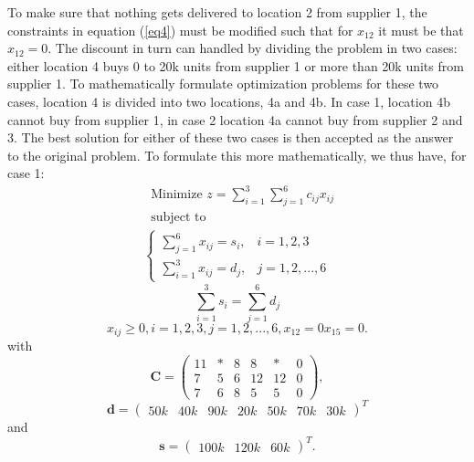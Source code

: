 \documentclass{article}
\begin{document}
  \noindent
  To make sure that nothing gets delivered to location 2 from supplier 1, the
  constraints in equation (\ref{eq4}) must be modified such that for $x_{12}$
  it must be that $x_{12} = 0$. The discount in turn can handled by dividing
  the problem in two cases: either location 4 buys 0 to 20k units from supplier
  1 or more than 20k units from supplier 1. To mathematically formulate
  optimization problems for these two cases, location 4 is divided into two
  locations, 4a and 4b. In case 1, location 4b cannot buy from supplier 1, in
  case 2 location 4a cannot buy from supplier 2 and 3. The best solution for
  either of these two cases is then accepted as the answer to the original
  problem. To formulate this more mathematically, we thus have, for case 1:
  \begin{align*}
  & \text{Minimize } z = \sum_{i=1}^{3}\sum_{j=1}^6 c_{ij}x_{ij} \\
  & \text{subject to}
    \label{eq10}
  \end{align*}
  \begin{align}
    \begin{cases}
      \sum_{j=1}^{6} x_{ij} = s_{i}, & i = 1, 2, 3 \\
      \sum_{i=1}^{3} x_{ij} = d_{j}, & j = 1, 2, ..., 6
    \end{cases}
  \end{align}
  \begin{equation}
    \sum_{i=1}^{3} s_{i} = \sum_{j=1}^6 d_{j}
    \label{eq12}
  \end{equation}
  \begin{equation}
    x_{ij} \geq 0, i = 1, 2, 3, j = 1, 2, ..., 6, x_{12} = 0 x_{15} = 0.
    \label{eq13}
  \end{equation}
  with
  \begin{equation}
    \mathbf{C} =
    \begin{pmatrix}
      11 & * & 8 & 8  & *  & 0\\
      7  & 5 & 6 & 12 & 12 & 0\\
      7  & 6 & 8 & 5  & 5  & 0
    \end{pmatrix},
    \label{eq14}
  \end{equation}
  \begin{equation}
    \mathbf{d} =
    \begin{pmatrix}
      50k & 40k & 90k & 20k & 50k & 70k & 30k
    \end{pmatrix}^T
    \label{eq15}
  \end{equation}
  and
  \begin{equation}
    \mathbf{s} =
    \begin{pmatrix}
      100k & 120k & 60k
    \end{pmatrix}^T.
    \label{eq16}
  \end{equation}
\end{document}

